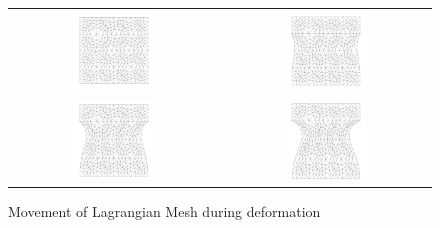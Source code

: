 \begin{figure}[htb]
\centering
\begin{tabular}{cc}
	\includegraphics[width=0.4\textwidth]{../figures/lagrangian_mesh_movement_001.png}
 &  \includegraphics[width=0.4\textwidth]{../figures/lagrangian_mesh_movement_002.png} 
 \\

	\includegraphics[width=0.4\textwidth]{../figures/lagrangian_mesh_movement_003.png} 
 &  \includegraphics[width=0.4\textwidth]{../figures/lagrangian_mesh_movement_004.png}  
 \\

\end{tabular}
\caption[bla]%
{Movement of Lagrangian Mesh  during deformation \protect\footnotemark}
\label{fig:LagMesh}
\end{figure}


